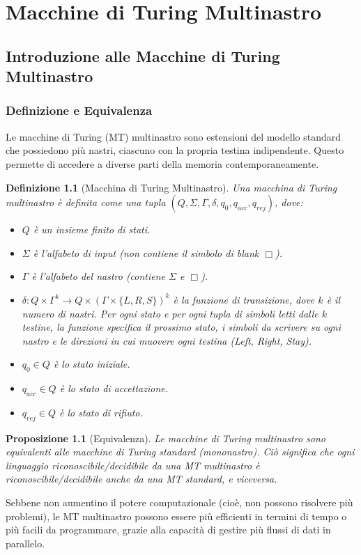 \documentclass[a4paper, 11pt]{book} %
\newtheorem{definition}[theorem]{Definizione}
\newtheorem{proposition}[theorem]{Proposizione}
\theoremstyle{definition}
\begin{document}

\chapter{Macchine di Turing Multinastro}



\section{Introduzione alle Macchine di Turing Multinastro}

\subsection{Definizione e Equivalenza}
Le macchine di Turing (MT) multinastro sono estensioni del modello standard che possiedono più nastri, ciascuno con la propria testina indipendente. Questo permette di accedere a diverse parti della memoria contemporaneamente.

\begin{definition}[Macchina di Turing Multinastro]
Una macchina di Turing multinastro è definita come una tupla $(Q, \Sigma, \Gamma, \delta, q_0, q_{acc}, q_{rej})$, dove:
\begin{itemize}
    \item $Q$ è un insieme finito di stati.
    \item $\Sigma$ è l'alfabeto di input (non contiene il simbolo di blank $\Box$).
    \item $\Gamma$ è l'alfabeto del nastro (contiene $\Sigma$ e $\Box$).
    \item $\delta: Q \times \Gamma^k \to Q \times (\Gamma \times \{L, R, S\})^k$ è la funzione di transizione, dove $k$ è il numero di nastri. Per ogni stato e per ogni tupla di simboli letti dalle $k$ testine, la funzione specifica il prossimo stato, i simboli da scrivere su ogni nastro e le direzioni in cui muovere ogni testina (Left, Right, Stay).
    \item $q_0 \in Q$ è lo stato iniziale.
    \item $q_{acc} \in Q$ è lo stato di accettazione.
    \item $q_{rej} \in Q$ è lo stato di rifiuto.
\end{itemize}
\end{definition}

\begin{proposition}[Equivalenza]
Le macchine di Turing multinastro sono equivalenti alle macchine di Turing standard (mononastro). Ciò significa che ogni linguaggio riconoscibile/decidibile da una MT multinastro è riconoscibile/decidibile anche da una MT standard, e viceversa.
\end{proposition}
Sebbene non aumentino il potere computazionale (cioè, non possono risolvere più problemi), le MT multinastro possono essere più efficienti in termini di tempo o più facili da programmare, grazie alla capacità di gestire più flussi di dati in parallelo.
\end{document}
